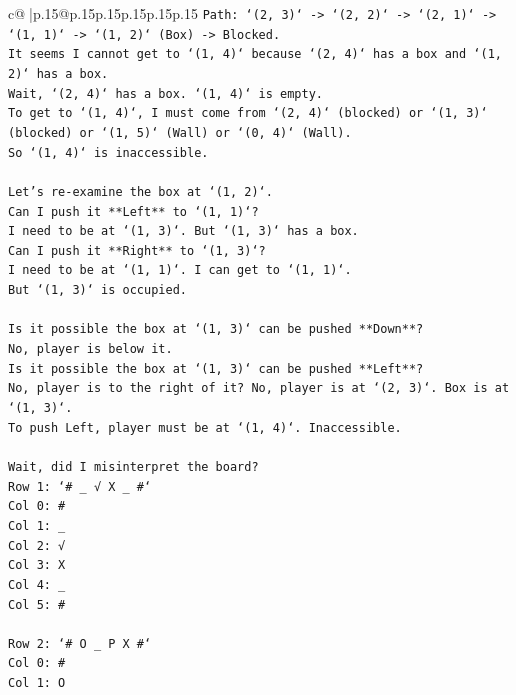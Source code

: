 \documentclass{article}
\begin{document}
{\begin{supertabular}{c@{$\;$}|p{.15\linewidth}@{}p{.15\linewidth}p{.15\linewidth}p{.15\linewidth}p{.15\linewidth}p{.15\linewidth}}
{{{\texttt{Path: `(2, 3)` {-}> `(2, 2)` {-}> `(2, 1)` {-}> `(1, 1)` {-}> `(1, 2)` (Box) {-}> Blocked.} \\
\texttt{It seems I cannot get to `(1, 4)` because `(2, 4)` has a box and `(1, 2)` has a box.} \\
\texttt{Wait, `(2, 4)` has a box. `(1, 4)` is empty.} \\
\texttt{To get to `(1, 4)`, I must come from `(2, 4)` (blocked) or `(1, 3)` (blocked) or `(1, 5)` (Wall) or `(0, 4)` (Wall).} \\
\texttt{So `(1, 4)` is inaccessible.} \\
\\ 
\texttt{Let's re{-}examine the box at `(1, 2)`.} \\
\texttt{Can I push it **Left** to `(1, 1)`?} \\
\texttt{I need to be at `(1, 3)`. But `(1, 3)` has a box.} \\
\texttt{Can I push it **Right** to `(1, 3)`?} \\
\texttt{I need to be at `(1, 1)`. I can get to `(1, 1)`.} \\
\texttt{But `(1, 3)` is occupied.} \\
\\ 
\texttt{Is it possible the box at `(1, 3)` can be pushed **Down**?} \\
\texttt{No, player is below it.} \\
\texttt{Is it possible the box at `(1, 3)` can be pushed **Left**?} \\
\texttt{No, player is to the right of it? No, player is at `(2, 3)`. Box is at `(1, 3)`.} \\
\texttt{To push Left, player must be at `(1, 4)`. Inaccessible.} \\
\\ 
\texttt{Wait, did I misinterpret the board?} \\
\texttt{Row 1: `\# \_ √ X \_ \#`} \\
\texttt{Col 0: \#} \\
\texttt{Col 1: \_} \\
\texttt{Col 2: √} \\
\texttt{Col 3: X} \\
\texttt{Col 4: \_} \\
\texttt{Col 5: \#} \\
\\ 
\texttt{Row 2: `\# O \_ P X \#`} \\
\texttt{Col 0: \#} \\
\texttt{Col 1: O} \\
}}}
\end{supertabular}}
\end{document}
